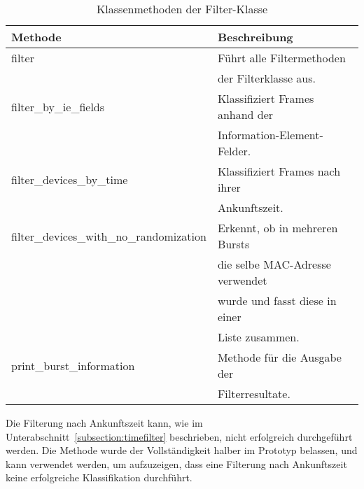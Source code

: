 \begin{table}[h!]
    \centering
    \begin{tabular}{|l|l|}
        \hline
        \textbf{Methode} & \textbf{Beschreibung} \\
        \hline 
        filter & Führt alle Filtermethoden \\
        & der Filterklasse aus. \\
        \hline
        filter\_by\_ie\_fields & Klassifiziert Frames anhand der \\
        & Information-Element-Felder. \\
        \hline
        filter\_devices\_by\_time & Klassifiziert Frames nach ihrer\\
        & Ankunftszeit. \\
        \hline
        filter\_devices\_with\_no\_randomization & Erkennt, ob in mehreren Bursts \\
        & die selbe MAC-Adresse verwendet\\ 
        &wurde  und fasst diese in einer\\
        & Liste zusammen. \\
        \hline
        print\_burst\_information & Methode für die Ausgabe der \\
        & Filterresultate. \\
        \hline
    \end{tabular}
    \caption{Klassenmethoden der Filter-Klasse
    \label{table:filtermethods}}  
\end{table}
       
Die Filterung nach Ankunftszeit kann, wie im 
Unterabschnitt~\ref{subsection:timefilter} beschrieben, 
nicht erfolgreich durchgeführt werden. 
Die Methode wurde der Vollständigkeit halber im Prototyp belassen, und kann 
verwendet werden, um aufzuzeigen, dass eine Filterung nach Ankunftszeit 
keine erfolgreiche Klassifikation durchführt.

\clearpage